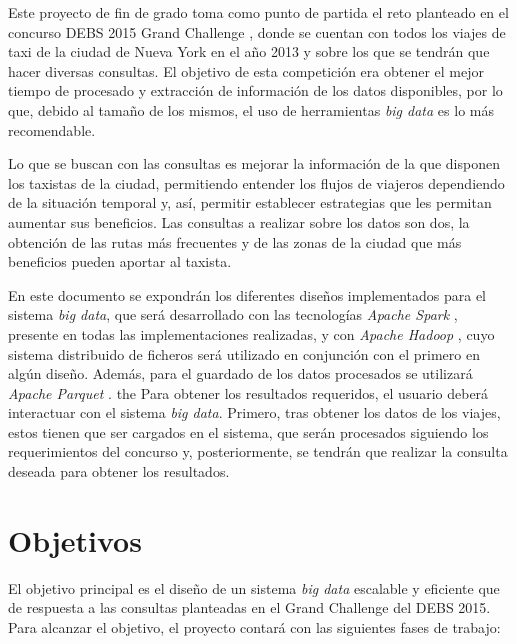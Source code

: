 Este proyecto de fin de grado toma como punto de partida el reto planteado en el concurso \gls{DEBS} 2015 Grand Challenge \cite{grandChallenge}, donde se cuentan con todos los viajes de taxi de la ciudad de Nueva York en el año 2013 y sobre los que se tendrán que hacer diversas consultas. El objetivo de esta competición era obtener el mejor tiempo de procesado y extracción de información de los datos disponibles, por lo que, debido al tamaño de los mismos, el uso de herramientas \textit{big data} es lo más recomendable.

Lo que se buscan con las consultas es mejorar la información de la que disponen los taxistas de la ciudad, permitiendo entender los flujos de viajeros dependiendo de la situación temporal y, así, permitir establecer estrategias que les permitan aumentar sus beneficios. Las consultas a realizar sobre los datos son dos, la obtención de las rutas más frecuentes y de las zonas de la ciudad que más beneficios pueden aportar al taxista.

En este documento se expondrán los diferentes diseños implementados para el sistema \textit{big data}, que será desarrollado con las tecnologías \textit{Apache Spark} \cite{spark}, presente en todas las implementaciones realizadas, y con \textit{Apache Hadoop} \cite{hadoop}, cuyo sistema distribuido de ficheros será utilizado en conjunción con el primero en algún diseño. Además, para el guardado de los datos procesados se utilizará \textit{Apache Parquet} \cite{parquet}.
the
Para obtener los resultados requeridos, el usuario deberá interactuar con el sistema \textit{big data}. Primero, tras obtener los datos de los viajes, estos tienen que ser cargados en el sistema, que serán procesados siguiendo los requerimientos del concurso y, posteriormente, se tendrán que realizar la consulta deseada para obtener los resultados.

\section{Objetivos}

El objetivo principal es el diseño de un sistema \textit{big data} escalable y eficiente que de respuesta a las consultas planteadas en el Grand Challenge del DEBS 2015. Para alcanzar el objetivo, el proyecto contará con las siguientes fases de trabajo:

